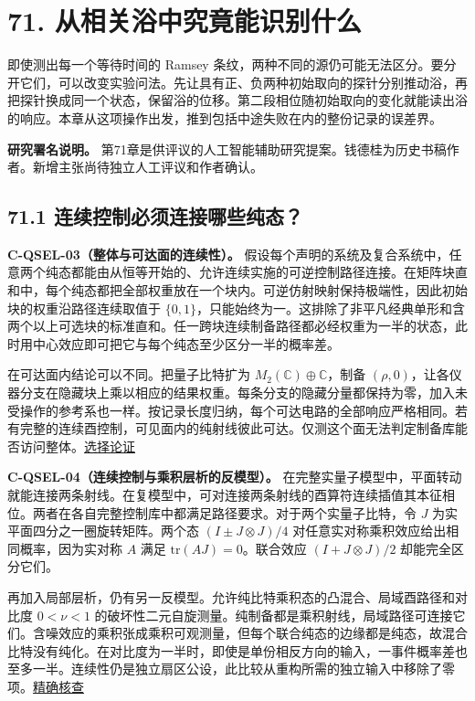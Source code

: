\documentclass[
  11pt,
  oneside]{book}
\begin{document}
\chapter{71. 从相关浴中究竟能识别什么}\label{ch-71}\hypertarget{ch-71}{}

即使测出每一个等待时间的 Ramsey
条纹，两种不同的源仍可能无法区分。要分开它们，可以改变实验问法。先让具有正、负两种初始取向的探针分别推动浴，再把探针换成同一个状态，保留浴的位移。第二段相位随初始取向的变化就能读出浴的响应。本章从这项操作出发，推到包括中途失败在内的整份记录的误差界。

\textbf{研究署名说明。}
第71章是供评议的人工智能辅助研究提案。钱德桂为历史书稿作者。新增主张尚待独立人工评议和作者确认。

\section{71.1 连续控制必须连接哪些纯态？}

\protect\hypertarget{c-qsel-03}{}{}

\textbf{C-QSEL-03（整体与可达面的连续性）。}
假设每个声明的系统及复合系统中，任意两个纯态都能由从恒等开始的、允许连续实施的可逆控制路径连接。在矩阵块直和中，每个纯态都把全部权重放在一个块内。可逆仿射映射保持极端性，因此初始块的权重沿路径连续取值于
\(\{0,1\}\)，只能始终为一。这排除了非平凡经典单形和含两个以上可选块的标准直和。任一跨块连续制备路径都必经权重为一半的状态，此时用中心效应即可把它与每个纯态至少区分一半的概率差。

在可达面内结论可以不同。把量子比特扩为
\(M_2(\mathbb C)\oplus\mathbb C\)，制备
\((\rho,0)\)，让各仪器分支在隐藏块上乘以相应的结果权重。每条分支的隐藏分量都保持为零，加入未受操作的参考系也一样。按记录长度归纳，每个可达电路的全部响应严格相同。若有完整的连续酉控制，可见面内的纯射线彼此可达。仅测这个面无法判定制备库能否访问整体。\href{../correlated_bath/selection/SELECTION.md}{选择论证}

\protect\hypertarget{c-qsel-04}{}{}

\textbf{C-QSEL-04（连续控制与乘积层析的反模型）。}
在完整实量子模型中，平面转动就能连接两条射线。在复模型中，可对连接两条射线的酉算符连续插值其本征相位。两者在各自完整控制库中都满足路径要求。对于两个实量子比特，令
\(J\) 为实平面四分之一圈旋转矩阵。两个态 \((I\pm J\otimes J)/4\)
对任意实对称乘积效应给出相同概率，因为实对称 \(A\) 满足
\(\mathrm{tr}(AJ)=0\)。联合效应 \((I+J\otimes J)/2\) 却能完全区分它们。

再加入局部层析，仍有另一反模型。允许纯比特乘积态的凸混合、局域酉路径和对比度
\(0<\nu<1\)
的破坏性二元自旋测量。纯制备都是乘积射线，局域路径可连接它们。含噪效应的乘积张成乘积可观测量，但每个联合纯态的边缘都是纯态，故混合比特没有纯化。在对比度为一半时，即使是单份相反方向的输入，一事件概率差也至多一半。连续性仍是独立扇区公设，此比较从重构所需的独立输入中移除了零项。\href{../correlated_bath/selection/check_selection.py}{精确核查}
\end{document}

